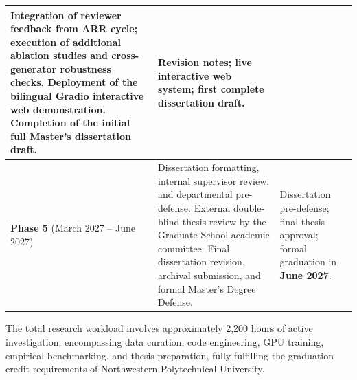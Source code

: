 \begin{table}[t]
\begin{tabularx}{\textwidth}{|p{}|X|p{}|}
Integration of reviewer feedback from ARR cycle; execution of additional ablation studies and cross-generator robustness checks. Deployment of the bilingual Gradio interactive web demonstration. Completion of the initial full Master's dissertation draft. & 
Revision notes; live interactive web system; first complete dissertation draft. \\
\hline
\textbf{Phase 5} \newline (March 2027 -- June 2027) & 
Dissertation formatting, internal supervisor review, and departmental pre-defense. External double-blind thesis review by the Graduate School academic committee. Final dissertation revision, archival submission, and formal Master's Degree Defense. & 
Dissertation pre-defense; final thesis approval; formal graduation in \textbf{June 2027}. \\
\hline
\end{tabularx}
\end{table}

The total research workload involves approximately 2,200 hours of active investigation, encompassing data curation, code engineering, GPU training, empirical benchmarking, and thesis preparation, fully fulfilling the graduation credit requirements of Northwestern Polytechnical University.
